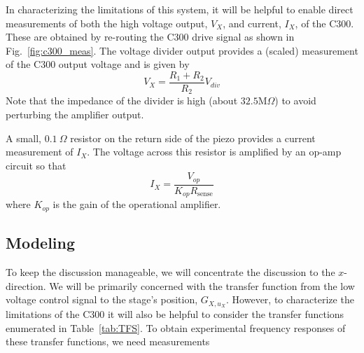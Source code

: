 \documentclass[journal,twocolumn,twoside]{IEEEtran/IEEEtran}
\begin{document}
In characterizing the limitations of this system, it will be helpful to enable direct measurements of both the high voltage output, $V_X$, and current, $I_X$, of the C300. These are obtained by re-routing the C300 drive signal as shown in Fig.~\ref{fig:c300_meas}. The voltage divider output provides a (scaled) measurement of the C300 output voltage and is given by
\begin{equation}
V_X = \frac{R_1 + R_2}{R_2}V_{div}
\end{equation}
Note that the impedance of the divider is high (about $32.5\text{M}\Omega$) to avoid perturbing the amplifier output.

A small, $0.1~\Omega$ resistor on the return side of the piezo provides a current measurement of $I_X$. The voltage across this resistor is amplified by an op-amp circuit so that
\begin{equation}
I_{X} = \frac{V_{op}}{K_{op}R_{\text{sense}}}
\end{equation}
where $K_{op}$ is the gain of the operational amplifier.
\subsection{Modeling}
%   
%   

To keep the discussion manageable, we will concentrate the discussion to the $x$-direction. We will be primarily concerned with the transfer function from the low voltage control signal to the stage's position, $G_{X,u_X}$. However, to characterize the limitations of the C300 it will also be helpful to consider the transfer functions enumerated in Table~\ref{tab:TFS}. To obtain experimental frequency responses of these transfer functions, we need measurements 
\end{document}
